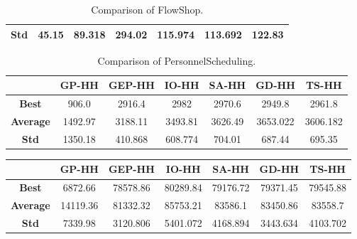 \documentclass[a4paper,12pt]{article}
\begin{document}
{\begin{table}[h!]
\begin{tabular}{| c | c | c | c | c| c| c|}
                    \hline
                    \textbf{Std} & 45.15 & 89.318& 294.02& 115.974& 113.692& 122.83\\
                    \hline
                \end{tabular}
                \caption{Comparison of FlowShop.} 
        \end{table}  
        \begin{table}[h!] 
                \small 
                \centering
                \begin{tabular}{| c | c | c | c | c| c| c|} 
                    \hline   
                    &\textbf{GP-HH} & \textbf{GEP-HH} & \textbf{IO-HH} & \textbf{SA-HH} & \textbf{GD-HH} & \textbf{TS-HH} \\
                    \hline
                    \textbf{Best} & 906.0 & 2916.4& 2982& 2970.6& 2949.8&2961.8\\
                    \hline
                    \textbf{Average} & 1492.97 & 3188.11& 3493.81& 3626.49& 3653.022&3606.182\\
                    \hline
                    \textbf{Std} & 1350.18 & 410.868& 608.774& 704.01& 687.44& 695.35\\
                    \hline
                \end{tabular}
                \caption{Comparison of PersonnelScheduling.} 
        \end{table} 
        \newpage
        \begin{table}[h!] 
                \small 
                \centering
                \begin{tabular}{| c | c | c | c | c| c| c|} 
                    \hline   
                    &\textbf{GP-HH} & \textbf{GEP-HH} & \textbf{IO-HH} & \textbf{SA-HH} & \textbf{GD-HH} & \textbf{TS-HH} \\
                    \hline
                    \textbf{Best} & 6872.66 & 78578.86& 80289.84& 79176.72& 79371.45& 79545.88\\
                    \hline
                    \textbf{Average} & 14119.36 & 81332.32& 85753.21& 83586.1& 83450.86& 83558.7\\
                    \hline
                    \textbf{Std} & 7339.98 & 3120.806& 5401.072& 4168.894& 3443.634&4103.702\\

\end{tabular}
\end{table}}
\end{document}
